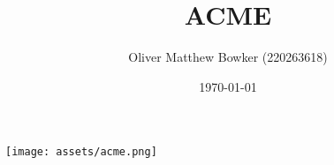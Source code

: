 \documentclass{article}
\title{ACME}
\author{Oliver Matthew Bowker (220263618)}
\date{\today}
\begin{document}
  \maketitle
  \begin{center}
    \texttt{[image: assets/acme.png]}
  \end{center}
  \newpage

  \tableofcontents
  \newpage

  \listoffigures
  \newpage

  \listoftables
  \newpage

  
  
  
  
  
  
  
  
  
\end{document}
